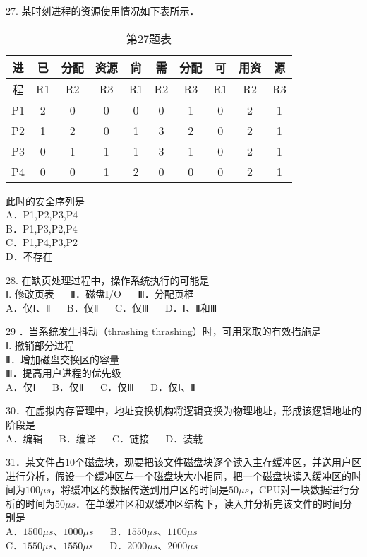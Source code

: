 27. 某时刻进程的资源使用情况如下表所示． \\
\begin{table}[ht]
\centering
\caption{第27题表}\label{Na11_tab2}
\begin{tabular}{|c|c|c|c|c|c|c|c|c|c|}
\hline
进 & 已 & 分配 & 资源 & 尙 & 需 & 分配 & 可 & 用资 & 源 \\
\hline
程 & R1 & R2 & R3 & R1 & R2 & R3 & R1 & R2 & R3 \\
\hline
P1 & 2 & 0 & 0 & 0 & 0 & 1 & 0 & 2 & 1 \\
\hline
P2 & 1 & 2 & 0 & 1 & 3 & 2 & 0 & 2 & 1 \\
\hline
P3 & 0 & 1 & 1 & 1 & 3 & 1 & 0 & 2 & 1 \\
\hline
P4 & 0 & 0 & 1 & 2 & 0 & 0 & 0 & 2 & 1 \\
\hline
\end{tabular}
\end{table}

此时的安全序列是 \\
A．P1,P2,P3,P4 \\
B．P1,P3,P2,P4 \\
C．P1,P4,P3,P2 \\
D．不存在


28. 在缺页处理过程中，操作系统执行的可能是 \\
Ⅰ. 修改页表 $\quad$ Ⅱ．磁盘I/O $\quad$ Ⅲ．分配页框 \\
A．仅Ⅰ、Ⅱ $\quad$ B．仅Ⅱ $\quad$ C．仅Ⅲ $\quad$ D．Ⅰ、Ⅱ和Ⅲ

29 ．当系统发生抖动（thrashing thrashing）时，可用采取的有效措施是 \\
Ⅰ. 撤销部分进程 \\
Ⅱ．增加磁盘交换区的容量 \\
Ⅲ．提高用户进程的优先级 \\
A．仅Ⅰ $\quad$ B．仅Ⅱ $\quad$ C．仅Ⅲ $\quad$ D．仅Ⅰ、Ⅱ

30．在虚拟内存管理中，地址变换机构将逻辑变换为物理地址，形成该逻辑地址的阶段是 \\
A．编辑 $\quad$ B．编译 $\quad$ C．链接 $\quad$ D．装载

31．某文件占$10$个磁盘块，现要把该文件磁盘块逐个读入主存缓冲区，并送用户区进行分析，假设一个缓冲区与一个磁盘块大小相同，把一个磁盘块读入缓冲区的时间为$100\mu s$，将缓冲区的数据传送到用户区的时间是$50\mu s$，CPU对一块数据进行分析的时间为$50\mu s$．在单缓冲区和双缓冲区结构下，读入并分析完该文件的时间分别是 \\
A．$1500\mu s$、$1000\mu s$ $\quad$ B．$1550\mu s$、$1100\mu s$ \\
C．$1550\mu s$、$1550\mu s$ $\quad$ D．$2000\mu s$、$2000\mu s$

